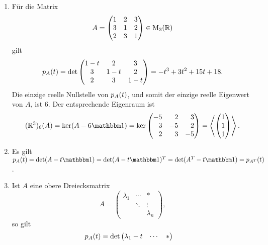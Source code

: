 \begin{example}
  \begin{enumerate}
    \item
      Für die Matrix
      \[
          A
        = \begin{pmatrix}
            1 & 2 & 3 \\
            3 & 1 & 2 \\
            2 & 3 & 1
          \end{pmatrix}
        \in \operatorname{M}_{3}(\mathbb{R})
      \]
      gilt
      \[
          p_{A}(t)
        = \det
          \begin{pmatrix}
            1-t & 2   & 3   \\
            3   & 1-t & 2   \\
            2   & 3   & 1-t
          \end{pmatrix}
        = -t^3 + 3t^2 + 15t + 18.
      \]
      Die einzige reelle Nullstelle von $p_{A}(t)$, und somit der einzige reelle Eigenwert von $A$, ist $6$.
      Der entsprechende Eigenraum ist
      \[
          \eigenspace{(\Real^3)}{A}{6}
        = \ker (A - 6 \Id)
        = \ker \begin{pmatrix*}[r]
                -5  &  2  &  3 \\
                 3  & -5  &  2 \\
                 2  &  3  & -5
              \end{pmatrix*}
        = \generated{ \vect{1 \\ 1 \\ 1} }.
      \]
    \item
      Es gilt
      $
          \charpol{A}(t)
        = \det (A - t \Id)
        = \det \transpose{(A - t \Id)}
        = \det (\transpose{A} - t \Id)
        = \charpol{\transpose{A}}(t)
      $.
    \item
      Ist $A$ eine obere Dreiecksmatrix
      \[
          A
        = \begin{pmatrix}
            \lambda_1 & \cdots  & *         \\
                      & \ddots  & \vdots    \\
                      &         & \lambda_n
          \end{pmatrix},
      \]
      so gilt
      \begin{align*}
            p_{A}(t)
        &=  \det
            \begin{pmatrix}
              \lambda_1 - t & \cdots  & *             \\

\end{pmatrix}
\end{align*}
\end{enumerate}
\end{example}
